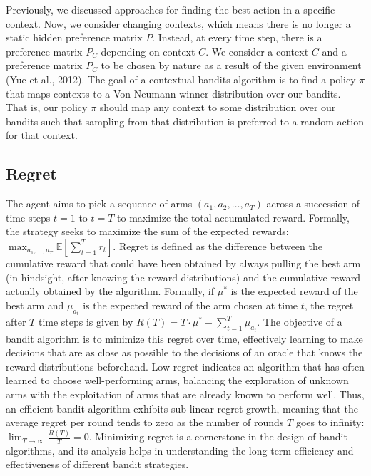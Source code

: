 \documentclass[
  letterpaper,
  numbers=noenddot,
  DIV=11]{scrreprt}
\theoremstyle{plain}
\theoremstyle{definition}
\theoremstyle{remark}
\begin{document}
Previously, we discussed approaches for finding the best action in a
specific context. Now, we consider changing contexts, which means there
is no longer a static hidden preference matrix \(P\). Instead, at every
time step, there is a preference matrix \(P_C\) depending on context
\(C\). We consider a context \(C\) and a preference matrix \(P_C\) to be
chosen by nature as a result of the given environment (Yue et al.,
2012). The goal of a contextual bandits algorithm is to find a policy
\(\pi\) that maps contexts to a Von Neumann winner distribution over our
bandits. That is, our policy \(\pi\) should map any context to some
distribution over our bandits such that sampling from that distribution
is preferred to a random action for that context.

\subsection{Regret}\label{regret}

The agent aims to pick a sequence of arms \((a_1, a_2, \ldots, a_T)\)
across a succession of time steps \(t = 1\) to \(t = T\) to maximize the
total accumulated reward. Formally, the strategy seeks to maximize the
sum of the expected rewards:
\(\max_{a_1, \ldots, a_T} \mathbb{E} \left[\sum_{t=1}^{T} r_t\right]\).
Regret is defined as the difference between the cumulative reward that
could have been obtained by always pulling the best arm (in hindsight,
after knowing the reward distributions) and the cumulative reward
actually obtained by the algorithm. Formally, if \(\mu^*\) is the
expected reward of the best arm and \(\mu_{a_t}\) is the expected reward
of the arm chosen at time \(t\), the regret after \(T\) time steps is
given by \(R(T) = T \cdot \mu^* - \sum_{t=1}^{T} \mu_{a_t}\). The
objective of a bandit algorithm is to minimize this regret over time,
effectively learning to make decisions that are as close as possible to
the decisions of an oracle that knows the reward distributions
beforehand. Low regret indicates an algorithm that has often learned to
choose well-performing arms, balancing the exploration of unknown arms
with the exploitation of arms that are already known to perform well.
Thus, an efficient bandit algorithm exhibits sub-linear regret growth,
meaning that the average regret per round tends to zero as the number of
rounds \(T\) goes to infinity:
\(\lim_{T \to \infty} \frac{R(T)}{T} = 0\). Minimizing regret is a
cornerstone in the design of bandit algorithms, and its analysis helps
in understanding the long-term efficiency and effectiveness of different
bandit strategies.
\end{document}
